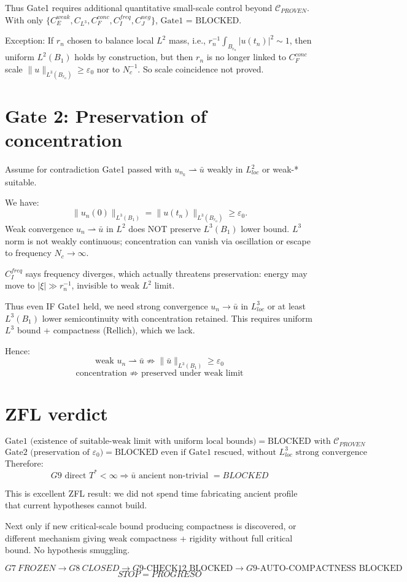 \documentclass[11pt]{article}
\begin{document}
Thus Gate1 requires additional quantitative small-scale control beyond $\mathcal C_{PROVEN}$. With only $\{C_E^{weak},C_{L^3},C_F^{conc},C_I^{freq},C_J^{neg}\}$, $\boxed{\text{Gate1 = BLOCKED}}$.

Exception: If $r_n$ chosen to balance local $L^2$ mass, i.e., $r_n^{-1}\int_{B_{r_n}}|u(t_n)|^2 \sim1$, then uniform $L^2(B_1)$ holds by construction, but then $r_n$ is no longer linked to $C_F^{conc}$ scale $\|u\|_{L^3(B_{r_n})}\ge\varepsilon_0$ nor to $N_c^{-1}$. So scale coincidence not proved.

\section{Gate 2: Preservation of concentration}
Assume for contradiction Gate1 passed with $u_{n_k}\rightharpoonup\bar u$ weakly in $L^2_{loc}$ or weak-* suitable.

We have:
\[
\|u_n(0)\|_{L^3(B_1)}=\|u(t_n)\|_{L^3(B_{r_n})}\ge\varepsilon_0.
\]
Weak convergence $u_n\rightharpoonup\bar u$ in $L^2$ does NOT preserve $L^3(B_1)$ lower bound. $L^3$ norm is not weakly continuous; concentration can vanish via oscillation or escape to frequency $N_c\to\infty$.

$C_I^{freq}$ says frequency diverges, which actually threatens preservation: energy may move to $|\xi|\gg r_n^{-1}$, invisible to weak $L^2$ limit.

Thus even IF Gate1 held, we need strong convergence $u_n\to\bar u$ in $L^3_{loc}$ or at least $L^3(B_1)$ lower semicontinuity with concentration retained. This requires uniform $L^3$ bound + compactness (Rellich), which we lack.

Hence:
\[
\boxed{\text{weak }u_n\rightharpoonup\bar u \not\Rightarrow \|\bar u\|_{L^3(B_1)}\ge\varepsilon_0}
\]
\[
\boxed{\text{concentration }\not\Rightarrow\text{ preserved under weak limit}}
\]

\section{ZFL verdict}
\[
\boxed{\text{Gate1 (existence of suitable-weak limit with uniform local bounds)} = \text{BLOCKED with }\mathcal C_{PROVEN}}
\]
\[
\boxed{\text{Gate2 (preservation of }\varepsilon_0\text{)} = \text{BLOCKED even if Gate1 rescued, without }L^3_{loc}\text{ strong convergence}}
\]
Therefore:
\[
\boxed{G9\text{ direct }T^*<\infty\Rightarrow\bar u\text{ ancient non-trivial } = BLOCKED}
\]

This is excellent ZFL result: we did not spend time fabricating ancient profile that current hypotheses cannot build.

Next only if new critical-scale bound producing compactness is discovered, or different mechanism giving weak compactness + rigidity without full critical bound. No hypothesis smuggling.

\[
\boxed{G7\ FROZEN \to G8\ CLOSED \to G9\text{-CHECK12 BLOCKED} \to G9\text{-AUTO-COMPACTNESS BLOCKED}}
\]
\[
\boxed{STOP = PROGRESO}
\]
\end{document}
